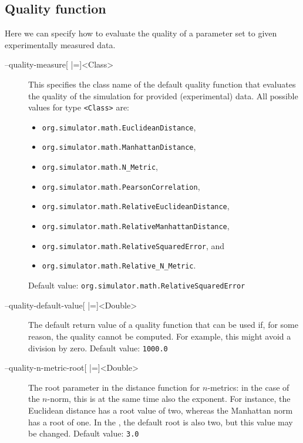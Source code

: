 \subsection{Quality function}
Here we can specify how to evaluate the quality of a parameter set to given experimentally measured data.
\begin{description}
\item[--quality-measure{[} |={]}<Class>]
          This specifies the class name of the default quality function
          that evaluates the quality of the simulation for provided
          (experimental) data.
          All possible values for type \texttt{<Class>} are:
          \begin{itemize}
          \item\texttt{org.simulator.math.EuclideanDistance},
          \item\texttt{org.simulator.math.ManhattanDistance},
          \item\texttt{org.simulator.math.N\_Metric},
          \item\texttt{org.simulator.math.PearsonCorrelation},
          \item\texttt{org.simulator.math.RelativeEuclideanDistance},
          \item\texttt{org.simulator.math.RelativeManhattanDistance},
          \item\texttt{org.simulator.math.RelativeSquaredError}, and
          \item\texttt{org.simulator.math.Relative\_N\_Metric}.
          \end{itemize}
          Default value: \texttt{org.simulator.math.RelativeSquaredError}
\item[--quality-default-value{[} |={]}<Double>]
          The default return value of a quality function that can be used
          if, for some reason, the quality cannot be computed. For example,
          this might avoid a division by zero.
          Default value: \texttt{1000.0}
\item[--quality-n-metric-root{[} |={]}<Double>]
          The root parameter in the distance function for $n$-metrics: in
          the case of the $n$-norm, this is at the same time also the exponent.
          For instance, the Euclidean distance has a root value of two,
          whereas the Manhattan norm has a root of one. In the \RSE, the
          default root is also two, but this value may be changed.
          Default value: \texttt{3.0}
\end{description}

